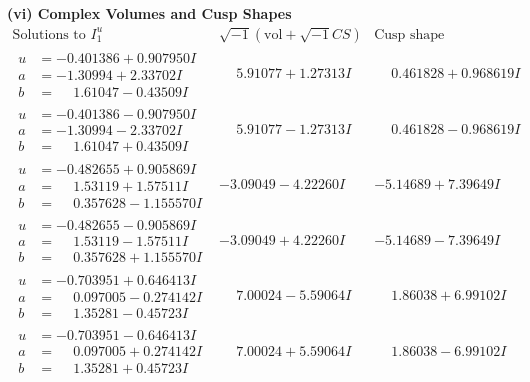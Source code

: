 \documentclass[1p]{elsarticle_modified}
\theoremstyle{definition}
\newcommand{\I}{\sqrt{-1}}
\begin{document}
\newpage\flushleft \textbf{(vi) Complex Volumes and Cusp Shapes}
$$\begin{array}{c|c|c}  
\text{Solutions to }I^u_{1}& \I (\text{vol} + \sqrt{-1}CS) & \text{Cusp shape}\\
 \hline 
\begin{aligned}
u &= -0.401386 + 0.907950 I \\
a &= -1.30994 + 2.33702 I \\
b &= \phantom{-}1.61047 - 0.43509 I\end{aligned}
 & \phantom{-}5.91077 + 1.27313 I & \phantom{-}0.461828 + 0.968619 I \\ \hline\begin{aligned}
u &= -0.401386 - 0.907950 I \\
a &= -1.30994 - 2.33702 I \\
b &= \phantom{-}1.61047 + 0.43509 I\end{aligned}
 & \phantom{-}5.91077 - 1.27313 I & \phantom{-}0.461828 - 0.968619 I \\ \hline\begin{aligned}
u &= -0.482655 + 0.905869 I \\
a &= \phantom{-}1.53119 + 1.57511 I \\
b &= \phantom{-}0.357628 - 1.155570 I\end{aligned}
 & -3.09049 - 4.22260 I & -5.14689 + 7.39649 I \\ \hline\begin{aligned}
u &= -0.482655 - 0.905869 I \\
a &= \phantom{-}1.53119 - 1.57511 I \\
b &= \phantom{-}0.357628 + 1.155570 I\end{aligned}
 & -3.09049 + 4.22260 I & -5.14689 - 7.39649 I \\ \hline\begin{aligned}
u &= -0.703951 + 0.646413 I \\
a &= \phantom{-}0.097005 - 0.274142 I \\
b &= \phantom{-}1.35281 - 0.45723 I\end{aligned}
 & \phantom{-}7.00024 - 5.59064 I & \phantom{-}1.86038 + 6.99102 I \\ \hline\begin{aligned}
u &= -0.703951 - 0.646413 I \\
a &= \phantom{-}0.097005 + 0.274142 I \\
b &= \phantom{-}1.35281 + 0.45723 I\end{aligned}
 & \phantom{-}7.00024 + 5.59064 I & \phantom{-}1.86038 - 6.99102 I \\ \hline\begin{aligned}

\end{aligned}
\end{array}$$
\end{document}
